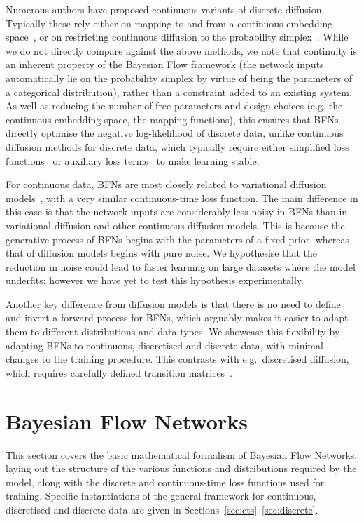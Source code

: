 \documentclass[11pt,table]{article}
\newcommand{\0}[1]{\constvec{0}{#1}}
\newcommand{\1}[1]{\constvec{1}{#1}}
\begin{document}
Numerous authors have proposed continuous variants of discrete diffusion.
Typically these rely either on mapping to and from a continuous embedding space~\citep{strudel2022self,li2022diffusionlm,dieleman2022continuous,chen2022analog}, or on restricting continuous diffusion to the probability simplex~\citep{richemond2022categorical,mahabadi2023tess,lou2023reflected}.
While we do not directly compare against the above methods, we note that continuity is an inherent property of the Bayesian Flow framework (the network inputs automatically lie on the probability simplex by virtue of being the parameters of a categorical distribution), rather than a constraint added to an existing system.
As well as reducing the number of free parameters and design choices (e.g. the continuous embedding space, the mapping functions), this ensures that BFNs directly optimise the negative log-likelihood of discrete data, unlike continuous diffusion methods for discrete data, which typically require either simplified loss functions~\citep{mahabadi2023tess} or auxiliary loss terms~\citep{li2022diffusionlm} to make learning stable.

For continuous data, BFNs are most closely related to variational diffusion models~\citep{kingma2021variational}, with a very similar continuous-time loss function.
The main difference in this case is that the network inputs are considerably less noisy in BFNs than in variational diffusion and other continuous diffusion models. 
This is because the generative process of BFNs begins with the parameters of a fixed prior, whereas that of diffusion models begins with pure noise.
We hypothesise that the reduction in noise could lead to faster learning on large datasets where the model underfits; however we have yet to test this hypothesis experimentally.

Another key difference from diffusion models is that there is no need to define and invert a forward process for BFNs, which arguably makes it easier to adapt them to different distributions and data types.
We showcase this flexibility by adapting BFNs to continuous, discretised and discrete data, with minimal changes to the training procedure.
This contrasts with e.g.\ discretised diffusion, which requires carefully defined transition matrices~\citep{austin2021d3pm}.
\section{Bayesian Flow Networks}\label{sec:bfn}
This section covers the basic mathematical formalism of Bayesian Flow Networks, laying out the structure of the various functions and distributions required by the model, along with the discrete and continuous-time loss functions used for training.
Specific instantiations of the general framework for continuous, discretised and discrete data are given in Sections~\ref{sec:cts}--\ref{sec:discrete}. 
\end{document}
